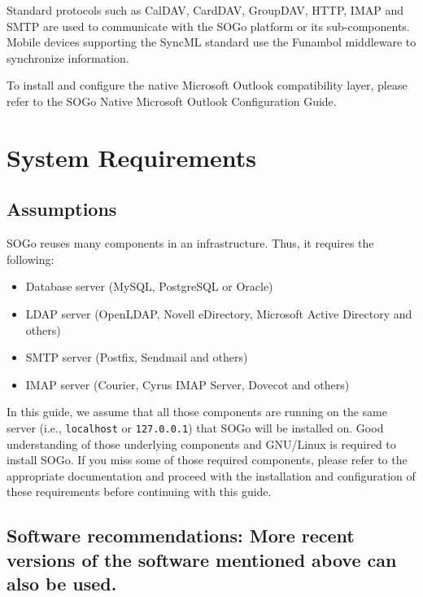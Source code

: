 \documentclass[]{article}
\begin{document}
Standard protocols such as CalDAV, CardDAV, GroupDAV, HTTP, IMAP and
SMTP are used to communicate with the SOGo platform or its
sub-components. Mobile devices supporting the SyncML standard use the
Funambol middleware to synchronize information.

To install and configure the native Microsoft Outlook compatibility
layer, please refer to the SOGo Native Microsoft Outlook Configuration
Guide.

\section{System Requirements}

\subsection{Assumptions}

SOGo reuses many components in an infrastructure. Thus, it requires the
following:

\begin{itemize}
\itemsep1pt\parskip0pt
\item
  Database server (MySQL, PostgreSQL or Oracle)
\item
  LDAP server (OpenLDAP, Novell eDirectory, Microsoft Active Directory
  and others)
\item
  SMTP server (Postfix, Sendmail and others)
\item
  IMAP server (Courier, Cyrus IMAP Server, Dovecot and others)
\end{itemize}

In this guide, we assume that all those components are running on the
same server (i.e., \texttt{localhost} or \texttt{127.0.0.1}) that SOGo
will be installed on. Good understanding of those underlying components
and GNU/Linux is required to install SOGo. If you miss some of those
required components, please refer to the appropriate documentation and
proceed with the installation and configuration of these requirements
before continuing with this guide.

\subsection{Software recommendations: More recent versions of the
software mentioned above can also be used.}
\end{document}
